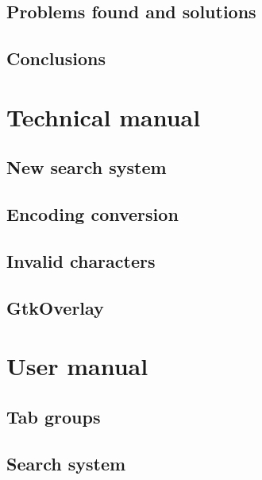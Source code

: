 \documentclass[a4paper,11pt,twoside]{book}
\begin{document}
\chapter{Problems found and solutions}
\chapter{Conclusions}
\part{Technical manual}






\chapter{New search system}
\chapter{Encoding conversion}
\chapter{Invalid characters}
\chapter{GtkOverlay}
\part{User manual}
\chapter{Tab groups}
\chapter{Search system}

\appendix


\nocite{*}


\end{document}
